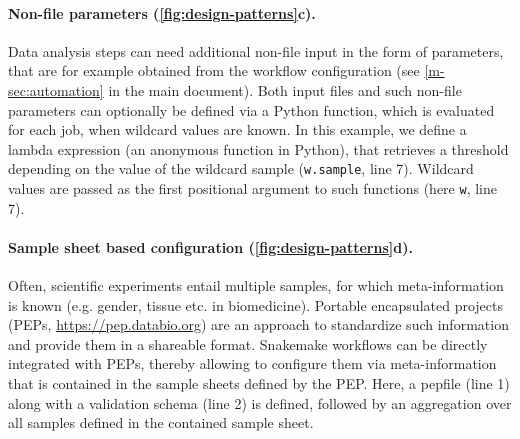 \documentclass{scrartcl}
\let\plainurl\url
\renewcommand{\url}[1]{\protect\plainurl{#1}}
\begin{document}
\paragraph{Non-file parameters (\autoref{fig:design-patterns}c).}
Data analysis steps can need additional non-file input in the form of parameters, that are for example obtained from the workflow configuration (see \autoref{m-sec:automation} in the main document).
Both input files and such non-file parameters can optionally be defined via a Python function, which is evaluated for each job, when wildcard values are known.
In this example, we define a lambda expression (an anonymous function in Python), that retrieves a threshold depending on the value of the wildcard sample (\lstinline!w.sample!, line 7).
Wildcard values are passed as the first positional argument to such functions (here \lstinline!w!, line 7).

\paragraph{Sample sheet based configuration (\autoref{fig:design-patterns}d).}
Often, scientific experiments entail multiple samples, for which meta-information is known (e.g. gender, tissue etc. in biomedicine).
Portable encapsulated projects (PEPs, \url{https://pep.databio.org}) are an approach to standardize such information and provide them in a shareable format.
Snakemake workflows can be directly integrated with PEPs, thereby allowing to configure them via meta-information that is contained in the sample sheets defined by the PEP.
Here, a pepfile (line 1) along with a validation schema (line 2) is defined, followed by an aggregation over all samples defined in the contained sample sheet.
\end{document}
